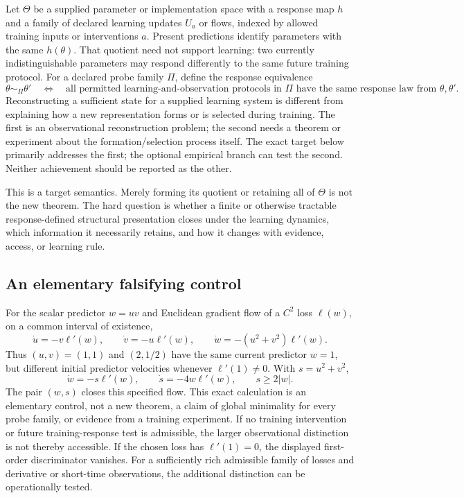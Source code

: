 \documentclass[11pt]{article}
\theoremstyle{remark}
\begin{document}
Let $\Theta$ be a supplied parameter or implementation space with a response map $h$ and a family of declared learning updates $U_a$ or flows, indexed by allowed training inputs or interventions $a$. Present predictions identify parameters with the same $h(\theta)$. That quotient need not support learning: two currently indistinguishable parameters may respond differently to the same future training protocol. For a declared probe family $\Pi$, define the response equivalence
\[
 \theta\sim_\Pi\theta'
 \quad\Longleftrightarrow\quad
 \text{all permitted learning-and-observation protocols in }\Pi
 \text{ have the same response law from }\theta,\theta'.
\]
Reconstructing a sufficient state for a supplied learning system is different from explaining how a new representation forms or is selected during training. The first is an observational reconstruction problem; the second needs a theorem or experiment about the formation/selection process itself. The exact target below primarily addresses the first; the optional empirical branch can test the second. Neither achievement should be reported as the other.

This is a target semantics. Merely forming its quotient or retaining all of $\Theta$ is not the new theorem. The hard question is whether a finite or otherwise tractable response-defined structural presentation closes under the learning dynamics, which information it necessarily retains, and how it changes with evidence, access, or learning rule.

\subsection{An elementary falsifying control}

For the scalar predictor $w=uv$ and Euclidean gradient flow of a $C^2$ loss $\ell(w)$, on a common interval of existence,
\[
 \dot u=-v\ell'(w),\qquad \dot v=-u\ell'(w),\qquad
 \dot w=-(u^2+v^2)\ell'(w).
\]
Thus $(u,v)=(1,1)$ and $(2,1/2)$ have the same current predictor $w=1$, but different initial predictor velocities whenever $\ell'(1)\ne0$. With $s=u^2+v^2$,
\[
 \dot w=-s\ell'(w),\qquad \dot s=-4w\ell'(w),\qquad s\ge 2|w|.
\]
The pair $(w,s)$ closes this specified flow. This exact calculation is an elementary control, not a new theorem, a claim of global minimality for every probe family, or evidence from a training experiment. If no training intervention or future training-response test is admissible, the larger observational distinction is not thereby accessible. If the chosen loss has $\ell'(1)=0$, the displayed first-order discriminator vanishes. For a sufficiently rich admissible family of losses and derivative or short-time observations, the additional distinction can be operationally tested.
\end{document}
